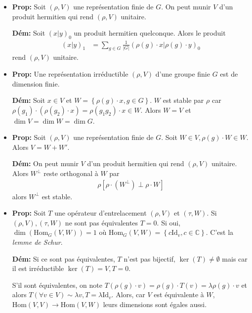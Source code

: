 \documentclass[10pt]{report}
\newcommand{\abs}[1]{\left|#1\right|}
\begin{document}
\begin{itemize}
    \item \textbf{Prop:} Soit $(\rho,V)$ une repr\'esentation finie de $G$. On peut munir $V$ d'un produit hermitien qui rend $(\rho,V)$ unitaire.

        \textbf{D\'em:} Soit $(x|y)_0$ un produit hermitien quelconque. Alors le produit
        \begin{align}
            (x|y)_1 &= \sum\limits_{g \in G}^{}\frac{1}{\abs{G}}\left( \rho(g)\cdot x | \rho(g) \cdot y\right)_0
        \end{align}
        rend $(\rho,V)$ unitaire.

    \item \textbf{Prop:} Une repr\'esentation irr\'eductible $(\rho,V)$ d'une groupe finie $G$ est de dimension finie.

        \textbf{D\'em:} Soit $x \in V$ et $W = \left\{ \rho(g) \cdot x, g \in G \right\}$. $W$ est stable par $\rho$ car $\rho(g_1) \cdot \left( \rho(g_2) \cdot x \right) = \rho(g_1g_2)\cdot x \in W$. Alors $W = V$ et $\dim V = \dim W = \dim G$.

    \item \textbf{Prop:} Soit $(\rho,V)$ une repr\'esentation finie de $G$. Soit $W \in V, \rho(g) \cdot W \in W$. Alors $V = W + W'$.

        \textbf{D\'em:} On peut munir $V$ d'un produit hermitien qui rend $(\rho,V)$ unitaire. Alors $W^\perp$ reste orthogonal \`a $W$ par
        \begin{align}
            \rho\left[ \rho \cdot \left( W^{\perp} \right) \perp \rho \cdot W \right]
        \end{align}
        alors $W^{\perp}$ est stable.

    \item \textbf{Prop:} Soit $T$ une op\'erateur d'entrelacement $(\rho,V)$ et $(\tau,W)$. Si $(\rho,V), (\tau,W)$ ne sont pas \'equivalentes $T = 0$. Si oui, $\dim (\mathrm{Hom}_G(V,W)) = 1$ o\`u $\mathrm{Hom}_G(V,W) = \left\{ c\mathrm{Id}_v, c \in \mathbb{C} \right\}$. C'est la \emph{lemme de Schur}.

        \textbf{D\'em:} Si ce sont pas \'equivalentes, $T$ n'est pas bijectif, $\ker(T) \neq \emptyset$ mais car il est irr\'eductible $\ker(T) = V, T = 0$. 
        
        S'il sont \'equivalentes, on note $T(\rho(g) \cdot v) = \rho(g)\cdot T(v) = \lambda \rho(g) \cdot v$ et alors $T(\forall v \in V) \sim \lambda v, T = \lambda \mathrm{Id}_v$. Alors, car $V$ est \'equivalente \`a $W$, $\mathrm{Hom}(V,V) \to \mathrm{Hom}(V,W)$ leurs dimensions sont \'egales aussi.


\end{itemize}
\end{document}
